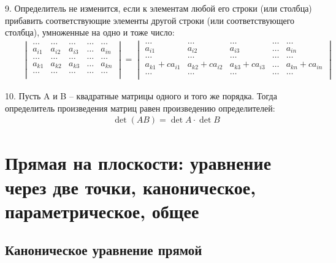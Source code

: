 \documentclass[12pt, fleqn]{extarticle}
\begin{document}
9. Определитель не изменится, если к элементам любой его строки (или столбца) прибавить соответствующие элементы другой строки (или соответствующего столбца), умноженные на одно и тоже число:
\begin{align*}
     &  &
    \begin{vmatrix}
        \dots  & \dots  & \dots  & \dots & \dots  \\
        a_{i1} & a_{i2} & a_{i3} & \dots & a_{in} \\
        \dots  & \dots  & \dots  & \dots & \dots  \\
        a_{k1} & a_{k2} & a_{k3} & \dots & a_{kn} \\
        \dots  & \dots  & \dots  & \dots & \dots  \\
    \end{vmatrix}
    =
    \begin{vmatrix}
        \dots            & \dots            & \dots            & \dots & \dots            \\
        a_{i1}           & a_{i2}           & a_{i3}           & \dots & a_{in}           \\
        \dots            & \dots            & \dots            & \dots & \dots            \\
        a_{k1} + ca_{i1} & a_{k2} + ca_{i2} & a_{k3} + ca_{i3} & \dots & a_{kn} + ca_{in} \\
        \dots            & \dots            & \dots            & \dots & \dots            \\
    \end{vmatrix}
\end{align*}

10. Пусть A и B – квадратные матрицы одного и того же порядка. Тогда определитель произведения матриц равен произведению определителей:
\begin{align*}
     &  &
    \det (AB) = \det A \cdot \det B
\end{align*}

\newpage

\section*{Прямая на плоскости: уравнение через две точки, каноническое, параметрическое, общее}\label{sec:line}

\subsection*{Каноническое уравнение прямой}
\end{document}
